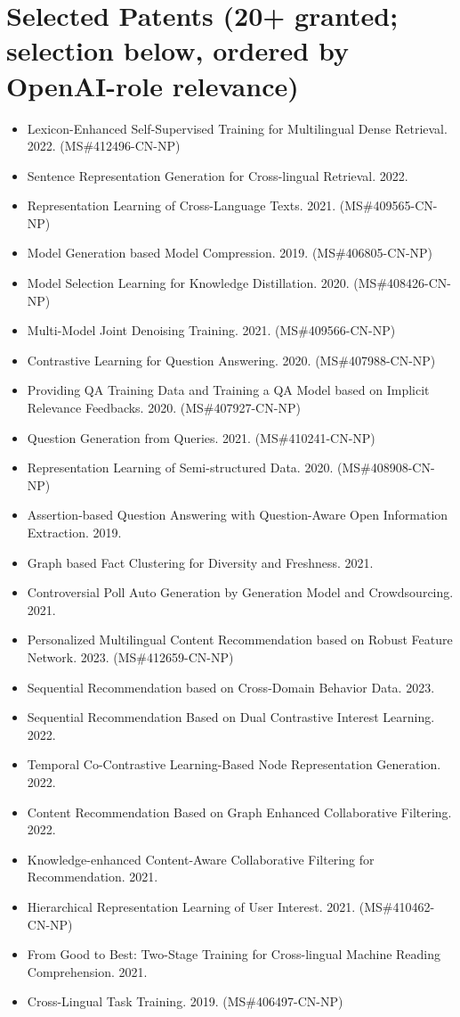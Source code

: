 \documentclass[10.5pt,letterpaper]{article}
\begin{document}
\section*{Selected Patents (20+ granted; selection below, ordered by OpenAI-role relevance)}
\begin{itemize}[leftmargin=1.1em, itemsep=0pt, topsep=1pt, parsep=0pt]
  \item Lexicon-Enhanced Self-Supervised Training for Multilingual Dense Retrieval. 2022. (MS\#412496-CN-NP)
  \item Sentence Representation Generation for Cross-lingual Retrieval. 2022.
  \item Representation Learning of Cross-Language Texts. 2021. (MS\#409565-CN-NP)
  \item Model Generation based Model Compression. 2019. (MS\#406805-CN-NP)
  \item Model Selection Learning for Knowledge Distillation. 2020. (MS\#408426-CN-NP)
  \item Multi-Model Joint Denoising Training. 2021. (MS\#409566-CN-NP)
  \item Contrastive Learning for Question Answering. 2020. (MS\#407988-CN-NP)
  \item Providing QA Training Data and Training a QA Model based on Implicit Relevance Feedbacks. 2020. (MS\#407927-CN-NP)
  \item Question Generation from Queries. 2021. (MS\#410241-CN-NP)
  \item Representation Learning of Semi-structured Data. 2020. (MS\#408908-CN-NP)
  \item Assertion-based Question Answering with Question-Aware Open Information Extraction. 2019.
  \item Graph based Fact Clustering for Diversity and Freshness. 2021.
  \item Controversial Poll Auto Generation by Generation Model and Crowdsourcing. 2021.
  \item Personalized Multilingual Content Recommendation based on Robust Feature Network. 2023. (MS\#412659-CN-NP)
  \item Sequential Recommendation based on Cross-Domain Behavior Data. 2023.
  \item Sequential Recommendation Based on Dual Contrastive Interest Learning. 2022.
  \item Temporal Co-Contrastive Learning-Based Node Representation Generation. 2022.
  \item Content Recommendation Based on Graph Enhanced Collaborative Filtering. 2022.
  \item Knowledge-enhanced Content-Aware Collaborative Filtering for Recommendation. 2021.
  \item Hierarchical Representation Learning of User Interest. 2021. (MS\#410462-CN-NP)
  \item From Good to Best: Two-Stage Training for Cross-lingual Machine Reading Comprehension. 2021.
  \item Cross-Lingual Task Training. 2019. (MS\#406497-CN-NP)
\end{itemize}
\end{document}
